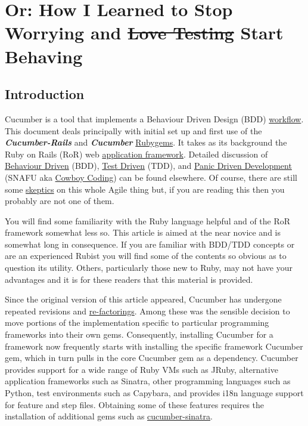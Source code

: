 \section{Or: How I Learned to Stop Worrying and \sout{Love Testing} Start Behaving}

\subsection{Introduction}

Cucumber is a tool that implements a Behaviour Driven Design (BDD) \href{http://en.wikipedia.org/wiki/Workflow}{workflow}.  This document deals principally with initial set up and first use of the \textbf{\emph{ Cucumber-Rails}} and \textbf{\emph{Cucumber}} \href{http://en.wikipedia.org/wiki/RubyGems}{Rubygems}. It takes as its background the Ruby on Rails (RoR) web \href{http://en.wikipedia.org/wiki/Framework}{application framework}.  Detailed discussion of \href{http://en.wikipedia.org/wiki/Behavior_driven_development}{Behaviour Driven} (BDD), \href{http://en.wikipedia.org/wiki/Test-driven_development}{Test Driven} (TDD), and \href{http://en.wikipedia.org/wiki/SNAFU}{Panic Driven Development} (SNAFU aka \href{http://cowboyprogramming.com/2007/01/11/delving-into-cowboy-programming/}{Cowboy Coding}) can be found elsewhere.  Of course, there are still some \href{http://steve-yegge.blogspot.ca/2006/09/good-agile-bad-agile_27.html}{skeptics} on this whole Agile thing but, if you are reading this then you probably are not one of them.

You will find some familiarity with the Ruby language helpful and of the RoR framework somewhat less so.  This article is aimed at the near novice and is somewhat long in consequence.  If you are familiar with BDD/TDD concepts or are an experienced Rubist you will find some of the contents so obvious as to question its utility.  Others, particularly those new to Ruby, may not have your advantages and it is for these readers that this material is provided.

Since the original version of this article appeared, Cucumber has undergone repeated revisions and \href{http://en.wikipedia.org/wiki/Code_refactoring}{re-factorings}.  Among these was the sensible decision to move portions of the implementation specific to particular programming frameworks into their own gems.  Consequently, installing Cucumber for a framework now frequently starts with installing the specific framework Cucumber gem, which in turn pulls in the core Cucumber gem as a dependency.  Cucumber provides support for a wide range of Ruby VMs such as JRuby, alternative application frameworks such as Sinatra, other programming languages such as Python, test environments such as Capybara, and provides i18n language support for feature and step files.  Obtaining some of these features requires the installation of additional gems such as \href{http://rubygems.org/gems/cucumber-sinatra}{cucumber-sinatra}.

